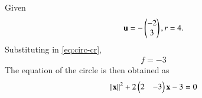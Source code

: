 Given
\begin{align}
	\mathbf{u} = -\begin{pmatrix}-2\\3\end{pmatrix},  r = 4.
\end{align}
Substituting in 
	\eqref{eq:circ-cr},
\begin{align}
	f = -3
\end{align}
The equation of the circle is then obtained as
\begin{align}
	\left\lVert\mathbf{x}\right\rVert^2 + 2\begin{pmatrix}2&-3\end{pmatrix}\mathbf{x} -3=0     		       
\end{align}	

